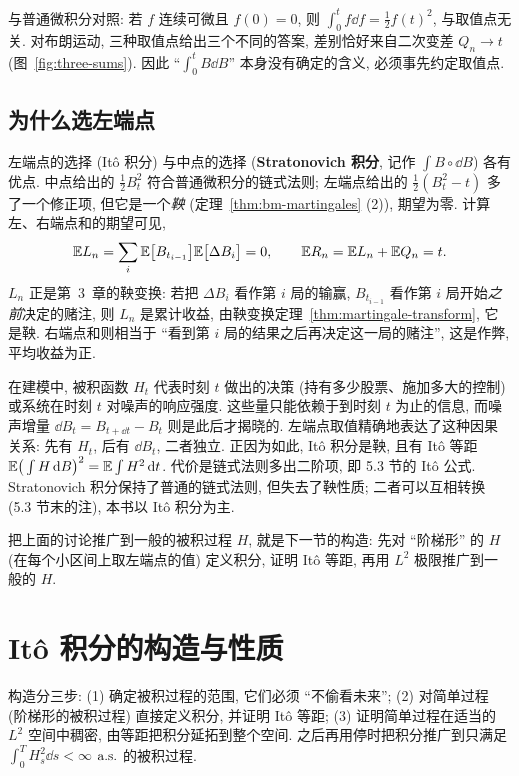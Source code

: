 与普通微积分对照: 若 $f$ 连续可微且 $f(0)=0$, 则 $\int_0^tf\dd f=\frac{1}{2}f(t)^2$, 与取值点无关. 对布朗运动, 三种取值点给出三个不同的答案, 差别恰好来自二次变差 $Q_n\to t$ (图~\ref{fig:three-sums}). 因此 ``$\int_0^tB\dd B$'' 本身没有确定的含义, 必须事先约定取值点.

\subsection{为什么选左端点}

左端点的选择 (It\^o 积分) 与中点的选择 (\textbf{Stratonovich 积分}, 记作 $\int B\circ\dd B$) 各有优点. 中点给出的 $\frac{1}{2}B_t^2$ 符合普通微积分的链式法则; 左端点给出的 $\frac{1}{2}(B_t^2-t)$ 多了一个修正项, 但它是一个\emph{鞅} (定理~\ref{thm:bm-martingales} (2)), 期望为零. 计算左、右端点和的期望可见,
\[
\mathbb{E} L_n=\sum_i\mathbb{E}\big[B_{t_{i-1}}\big]\mathbb{E}\big[\Delta B_i\big]=0,\qquad\mathbb{E} R_n=\mathbb{E} L_n+\mathbb{E} Q_n=t.
\]
$L_n$ 正是第~3~章的鞅变换: 若把 $\Delta B_i$ 看作第 $i$ 局的输赢, $B_{t_{i-1}}$ 看作第 $i$ 局开始\emph{之前}决定的赌注, 则 $L_n$ 是累计收益, 由鞅变换定理~\ref{thm:martingale-transform}, 它是鞅. 右端点和则相当于 ``看到第 $i$ 局的结果之后再决定这一局的赌注'', 这是作弊, 平均收益为正.

\begin{intuition}
在建模中, 被积函数 $H_t$ 代表时刻 $t$ 做出的决策 (持有多少股票、施加多大的控制) 或系统在时刻 $t$ 对噪声的响应强度. 这些量只能依赖于到时刻 $t$ 为止的信息, 而噪声增量 $\dd B_t=B_{t+\dd t}-B_t$ 则是此后才揭晓的. 左端点取值精确地表达了这种因果关系: 先有 $H_t$, 后有 $\dd B_t$, 二者独立. 正因为如此, It\^o 积分是鞅, 且有 It\^o 等距 $\mathbb{E}\big(\int H\mathop{}\!\mathrm{d} B\big)^2=\mathbb{E}\int H^2\mathop{}\!\mathrm{d} t$. 代价是链式法则多出二阶项, 即 5.3 节的 It\^o 公式. Stratonovich 积分保持了普通的链式法则, 但失去了鞅性质; 二者可以互相转换 (5.3 节末的注), 本书以 It\^o 积分为主.
\end{intuition}

把上面的讨论推广到一般的被积过程 $H$, 就是下一节的构造: 先对 ``阶梯形'' 的 $H$ (在每个小区间上取左端点的值) 定义积分, 证明 It\^o 等距, 再用 $L^2$ 极限推广到一般的 $H$.

\section{It\^o 积分的构造与性质}
\label{sec:5-2}

构造分三步: (1) 确定被积过程的范围, 它们必须 ``不偷看未来''; (2) 对简单过程 (阶梯形的被积过程) 直接定义积分, 并证明 It\^o 等距; (3) 证明简单过程在适当的 $L^2$ 空间中稠密, 由等距把积分延拓到整个空间. 之后再用停时把积分推广到只满足 $\int_0^TH_s^2\dd s<\infty$ $\text{a.s.}$ 的被积过程.

